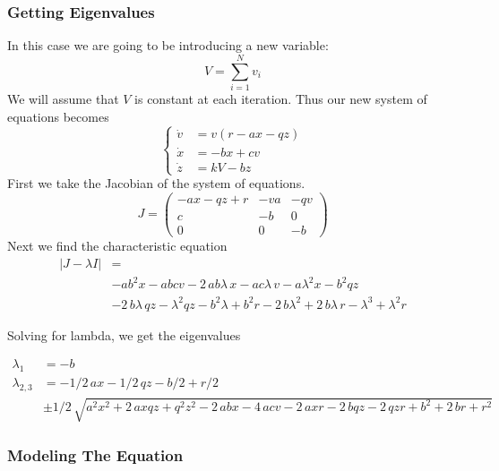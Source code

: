 \documentclass{article}
\begin{document}
\subsubsection{Getting Eigenvalues}
\label{sec:hiv2_evals}
In this case we are going to be introducing a new variable:
\[
V = \sum_{i = 1}^N v_i
\]
We will assume that $V$ is constant at each iteration. Thus our new system of equations becomes 
\begin{equation}
	\begin{cases}
		\dot v &= v(r - ax - qz) \\
		\dot x &= -bx + cv \\
		\dot z &= kV - bz
	\end{cases}
\end{equation}
First we take the Jacobian of the system of equations. 
\begin{equation}
    J=
    \begin{pmatrix}
        -ax-qz+r    &-va    &-qv    \\
        c           &-b     &0      \\
        0           &0       &-b
    \end{pmatrix}
\end{equation}
Next we find the characteristic equation
\begin{equation}
    \begin{split}
        | J - \lambda I | &= \\ 
        &-a{b}^{2}x-abcv-2\,ab\lambda\,x-ac\lambda\,v-a{\lambda}^{2}x-{b}^{2}qz \\
        &-2\,b\lambda\,qz-{\lambda}^{2}qz-{b}^{2}\lambda+{b}^{2}r-2\,b{\lambda}^{2}+2\,b\lambda\,r-{\lambda}^{3}+{\lambda}^{2}r
    \end{split}
\end{equation}

Solving for lambda, we get the eigenvalues

\begin{equation}
    \begin{split}
        \lambda_1 &=  -b\\
        \lambda_{2,3} &= -1/2\,ax-1/2\,qz-b/2+r/2 \\
        &\pm 1/2\,\sqrt {{a}^{2}{x}^{2}+2\,axqz+{q}^{2}{z}^{2}-2\,abx-4\,acv-2\,axr-2\,bqz-2\,qzr+{b}^{2}+2\,br+{r}^{2}}         
    \end{split}
\end{equation}


\subsubsection{Modeling The Equation}
\end{document}
